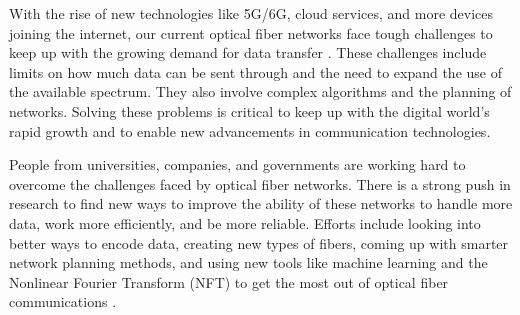 With the rise of new technologies like 5G/6G, cloud services, and more devices joining the internet, our current optical fiber networks face tough challenges to keep up with the growing demand for data transfer \cite{huawei2023}. These challenges include limits on how much data can be sent through and the need to expand the use of the available spectrum. They also involve complex algorithms and the planning of networks. Solving these problems is critical to keep up with the digital world's rapid growth and to enable new advancements in communication technologies.



People from universities, companies, and governments are working hard to overcome the challenges faced by optical fiber networks. There is a strong push in research to find new ways to improve the ability of these networks to handle more data, work more efficiently, and be more reliable. Efforts include looking into better ways to encode data, creating new types of fibers, coming up with smarter network planning methods, and using new tools like machine learning and the Nonlinear Fourier Transform (NFT) to get the most out of optical fiber communications \cite{Turitsyn:17}.




